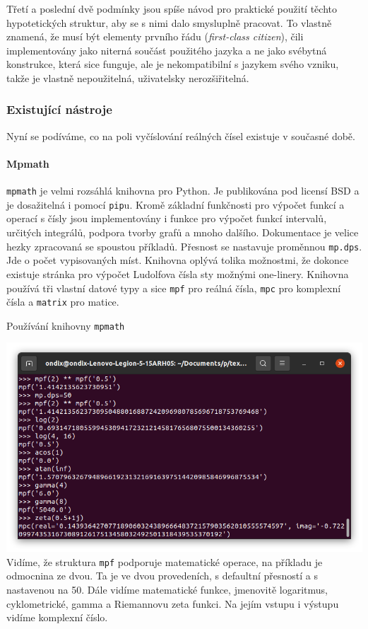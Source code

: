 Třetí a poslední dvě podmínky jsou spíše návod pro praktické použití těchto hypotetických struktur, aby se s nimi dalo smysluplně pracovat. To vlastně znamená, že musí být elementy prvního řádu (\textit{first-class citizen}), čili implementovány jako niterná součást použitého jazyka a ne jako svébytná konstrukce, která sice funguje, ale je nekompatibilní s jazykem svého vzniku, takže je vlastně nepoužitelná, uživatelsky nerozšiřitelná.

\subsubsection{Existující nástroje}\FloatBarrier
Nyní se podíváme, co na poli vyčíslování reálných čísel existuje v současné době.
\paragraph{Mpmath \cite{mpmath}}
\texttt{mpmath} je velmi rozsáhlá knihovna pro Python. Je publikována pod licensí BSD a je dosažitelná i pomocí \texttt{pip}u. Kromě základní funkčnosti pro výpočet funkcí a operací s čísly jsou implementovány i funkce pro výpočet funkcí intervalů, určitých integrálů, podpora tvorby grafů a mnoho dalšího. Dokumentace je velice hezky zpracovaná se spoustou příkladů. Přesnost se nastavuje proměnnou \texttt{mp.dps}. Jde o počet vypisovaných míst. Knihovna oplývá tolika možnostmi, že dokonce existuje stránka pro výpočet Ludolfova čísla sty možnými one-linery. Knihovna používá tři vlastní datové typy a sice \texttt{mpf} pro reálná čísla, \texttt{mpc} pro komplexní čísla a \texttt{matrix} pro matice.

\begin{myfigure}{}
\caption{Používání knihovny \texttt{mpmath}}
\includegraphics[width=\linewidth]{./graphics/mpmath.png}\label{obr:mpmath}
Vidíme, že struktura \texttt{mpf} podporuje matematické operace, na příkladu je odmocnina ze dvou. Ta je ve dvou provedeních, s defaultní přesností a s nastavenou na 50. Dále vidíme matematické funkce, jmenovitě logaritmus, cyklometrické, gamma a Riemannovu zeta funkci. Na jejím vstupu i výstupu vidíme komplexní číslo.
\end{myfigure}

